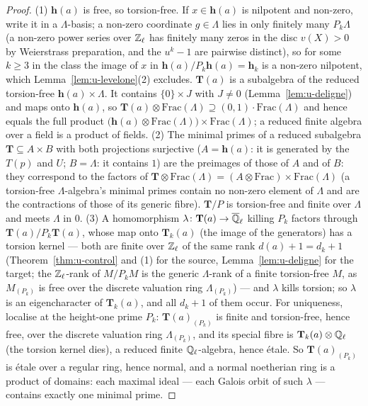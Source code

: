 \documentclass[11pt]{article}
\newcommand{\Iw}{\Lambda}                         %
\newcommand{\hcusp}{\mathbf{h}}                   %
\newcommand{\Tu}{\mathbf{T}}                      %
\newcommand{\Pk}[1]{P_{#1}}                       %
\newcommand{\Qlb}{\overline{\Q}_\ell}
\newcommand{\Zl}{\Z_\ell}
\newcommand{\Ql}{\Q_\ell}
\begin{document}
\begin{proof}
(1) $\hcusp(a)$ is free, so torsion-free. If $x\in\hcusp(a)$ is nilpotent and non-zero, write it in a $\Iw$-basis; a non-zero
coordinate $g\in\Iw$ lies in only finitely many $\Pk{k}\Iw$ (a non-zero power series over $\Zl$ has finitely many zeros in the disc
$v(X)>0$ by Weierstrass preparation, and the $u^{k}-1$ are pairwise distinct), so for some $k\ge3$ in the class the image of $x$ in
$\hcusp(a)/\Pk{k}\hcusp(a)=\hcusp_k$ is a non-zero nilpotent, which Lemma~\ref{lem:u-levelone}(2) excludes. $\Tu(a)$ is a
subalgebra of the reduced torsion-free $\hcusp(a)\times\Iw$. It contains $\{0\}\times J$ with $J\ne0$ (Lemma~\ref{lem:u-deligne}) and maps onto
$\hcusp(a)$, so $\Tu(a)\otimes\mathrm{Frac}(\Iw)\supseteq(0,1)\cdot\mathrm{Frac}(\Iw)$ and hence equals the full product
$\bigl(\hcusp(a)\otimes\mathrm{Frac}(\Iw)\bigr)\times\mathrm{Frac}(\Iw)$; a reduced finite algebra over a field is a product of fields.
(2) The minimal primes of a reduced subalgebra $\Tu\subseteq A\times B$ with both projections surjective ($A=\hcusp(a)$: it is
generated by the $T(p)$ and $U$; $B=\Iw$: it contains $1$) are the preimages of those of $A$ and of $B$: they correspond to the
factors of $\Tu\otimes\mathrm{Frac}(\Iw)=(A\otimes\mathrm{Frac})\times\mathrm{Frac}(\Iw)$ (a torsion-free $\Iw$-algebra's minimal primes
contain no non-zero element of $\Iw$ and are the contractions of those of its generic fibre). $\Tu/P$ is torsion-free and finite over
$\Iw$ and meets $\Iw$ in $0$. (3) A homomorphism $\lambda\colon\Tu(a)\to\Qlb$ killing $\Pk{k}$ factors through $\Tu(a)/\Pk{k}\Tu(a)$,
whose map onto $\Tu_k(a)$ (the image of the generators) has a torsion kernel --- both are finite over $\Zl$ of the same rank
$d(a)+1=d_k+1$ (Theorem~\ref{thm:u-control} and (1) for the source, Lemma~\ref{lem:u-deligne} for the target; the $\Zl$-rank of $M/\Pk{k}M$ is the generic $\Iw$-rank of a finite torsion-free $M$, as
$M_{(\Pk{k})}$ is free over the discrete valuation ring $\Iw_{(\Pk{k})}$) --- and $\lambda$ kills torsion; so $\lambda$ is an eigencharacter of $\Tu_k(a)$, and all
$d_k+1$ of them occur. For uniqueness, localise at the height-one prime $\Pk{k}$: $\Tu(a)_{(\Pk{k})}$ is finite and torsion-free, hence
free, over the discrete valuation ring $\Iw_{(\Pk{k})}$, and its special fibre is $\Tu_k(a)\otimes\Ql$ (the torsion kernel dies), a
reduced finite $\Ql$-algebra, hence étale. So $\Tu(a)_{(\Pk{k})}$ is étale over a regular ring, hence normal, and a normal
noetherian ring is a product of domains: each maximal ideal --- each Galois orbit of such $\lambda$ --- contains exactly one minimal
prime.
\end{proof}
\end{document}
